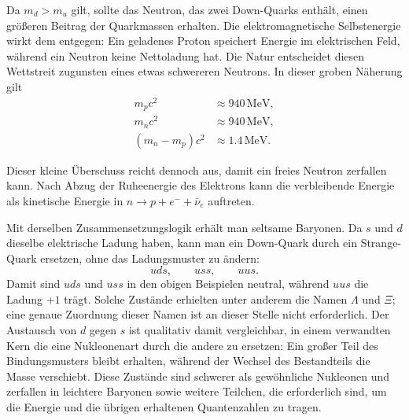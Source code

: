 Da \(m_d>m_u\) gilt, sollte das Neutron, das zwei Down-Quarks enthält, einen größeren Beitrag der Quarkmassen erhalten. Die elektromagnetische Selbstenergie wirkt dem entgegen: Ein geladenes Proton speichert Energie im elektrischen Feld, während ein Neutron keine Nettoladung hat. Die Natur entscheidet diesen Wettstreit zugunsten eines etwas schwereren Neutrons. In dieser groben Näherung gilt
\begin{align}
m_pc^2&\approx940\,\mathrm{MeV},\\
m_nc^2&\approx940\,\mathrm{MeV},\\
(m_n-m_p)c^2&\approx1.4\,\mathrm{MeV}.
\end{align}

\begin{classroomqa}
\end{classroomqa}

Dieser kleine Überschuss reicht dennoch aus, damit ein freies Neutron zerfallen kann. Nach Abzug der Ruheenergie des Elektrons kann die verbleibende Energie als kinetische Energie in \(n\to p+e^-+\bar\nu_e\) auftreten.

Mit derselben Zusammensetzungslogik erhält man seltsame Baryonen. Da \(s\) und \(d\) dieselbe elektrische Ladung haben, kann man ein Down-Quark durch ein Strange-Quark ersetzen, ohne das Ladungsmuster zu ändern:
\begin{equation}
uds,\qquad uss,\qquad uus.
\end{equation}
Damit sind \(uds\) und \(uss\) in den obigen Beispielen neutral, während \(uus\) die Ladung \(+1\) trägt. Solche Zustände erhielten unter anderem die Namen \(\Lambda\) und \(\Xi\); eine genaue Zuordnung dieser Namen ist an dieser Stelle nicht erforderlich. Der Austausch von \(d\) gegen \(s\) ist qualitativ damit vergleichbar, in einem verwandten Kern die eine Nukleonenart durch die andere zu ersetzen: Ein großer Teil des Bindungsmusters bleibt erhalten, während der Wechsel des Bestandteils die Masse verschiebt. Diese Zustände sind schwerer als gewöhnliche Nukleonen und zerfallen in leichtere Baryonen sowie weitere Teilchen, die erforderlich sind, um die Energie und die übrigen erhaltenen Quantenzahlen zu tragen.

\begin{classroomqa}
\end{classroomqa}

